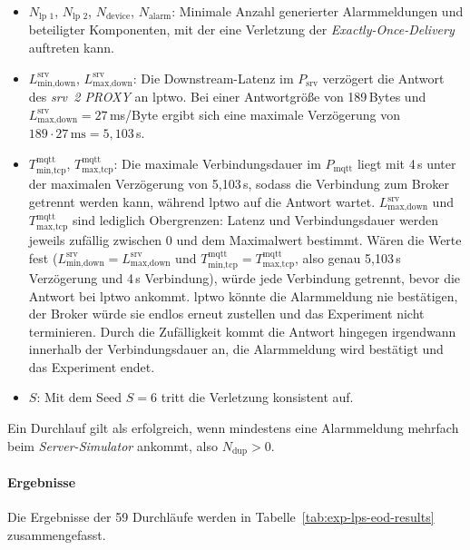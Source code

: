 \begin{itemize}
	\item $N_{\text{lp~1}}$, $N_{\text{lp~2}}$, $N_{\text{device}}$, $N_{\text{alarm}}$: Minimale Anzahl generierter Alarmmeldungen und beteiligter Komponenten, mit der eine Verletzung der \textit{Exactly-Once-Delivery} auftreten kann.

	\item $L_{\text{min,down}}^{\text{srv}}$, $L_{\text{max,down}}^{\text{srv}}$: Die Downstream-Latenz im $P_{\text{srv}}$ verzögert die Antwort des \textit{\gls{srv}~2 PROXY} an \gls{lptwo}. Bei einer Antwortgröße von 189\,Bytes und $L_{\text{max,down}}^{\text{srv}} = 27$\,ms/Byte ergibt sich eine maximale Verzögerung von $189 \cdot 27\,\text{ms} = 5{,}103$\,s.

	\item $T_{\text{min,tcp}}^{\text{mqtt}}$, $T_{\text{max,tcp}}^{\text{mqtt}}$: Die maximale Verbindungsdauer im $P_{\text{mqtt}}$ liegt mit 4\,s unter der maximalen Verzögerung von 5{,}103\,s, sodass die Verbindung zum Broker getrennt werden kann, während \gls{lptwo} auf die Antwort wartet. $L_{\text{max,down}}^{\text{srv}}$ und $T_{\text{max,tcp}}^{\text{mqtt}}$ sind lediglich Obergrenzen: Latenz und Verbindungsdauer werden jeweils zufällig zwischen 0 und dem Maximalwert bestimmt. Wären die Werte fest ($L_{\text{min,down}}^{\text{srv}} = L_{\text{max,down}}^{\text{srv}}$ und $T_{\text{min,tcp}}^{\text{mqtt}} = T_{\text{max,tcp}}^{\text{mqtt}}$, also genau 5{,}103\,s Verzögerung und 4\,s Verbindung), würde jede Verbindung getrennt, bevor die Antwort bei \gls{lptwo} ankommt. \gls{lptwo} könnte die Alarmmeldung nie bestätigen, der Broker würde sie endlos erneut zustellen und das Experiment nicht terminieren. Durch die Zufälligkeit kommt die Antwort hingegen irgendwann innerhalb der Verbindungsdauer an, die Alarmmeldung wird bestätigt und das Experiment endet.

	\item $S$: Mit dem Seed $S = 6$ tritt die Verletzung konsistent auf.
\end{itemize}

Ein Durchlauf gilt als erfolgreich, wenn mindestens eine Alarmmeldung mehrfach beim \textit{Server-Simulator} ankommt, also $N_{\text{dup}} > 0$.

\paragraph{Ergebnisse} Die Ergebnisse der 59 Durchläufe werden in Tabelle~\ref{tab:exp-lps-eod-results} zusammengefasst.

